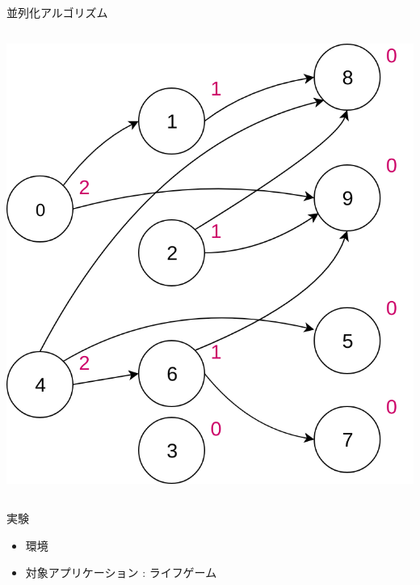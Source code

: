 \documentclass[dvipdfmx,final,t,12pt]{beamer}
\begin{document}
\begin{frame}[fragile]
\begin{block}{並列化アルゴリズム}
\begin{columns}
            \begin{column}{0.3\textwidth}
                \begin{center}
                    \includegraphics[scale=0.2]{image/RandomGraph.png}
                \end{center}
            \end{column}
        \end{columns}
    \end{block}

    \begin{block}{実験}
        \begin{itemize}
            \item 環境
            \item 対象アプリケーション : ライフゲーム
        \end{itemize}
    \end{block}
\end{frame}
\end{document}
